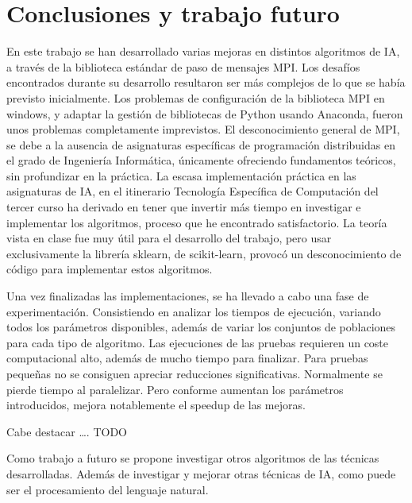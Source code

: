 \chapter{Conclusiones y trabajo futuro}
	
	En este trabajo se han desarrollado varias mejoras en distintos algoritmos de IA, a través de la biblioteca estándar de paso de mensajes MPI.
	Los desafíos encontrados durante su desarrollo resultaron ser más complejos de lo que se había previsto inicialmente. Los problemas de configuración de la biblioteca MPI en windows, y adaptar la gestión de bibliotecas de Python usando Anaconda, fueron unos problemas completamente imprevistos. El desconocimiento general de  MPI, se debe a la ausencia de asignaturas específicas de programación distribuidas en el grado de Ingeniería Informática, únicamente ofreciendo fundamentos teóricos, sin profundizar en la práctica. 
	La escasa implementación práctica en las asignaturas de IA, en el itinerario Tecnología Específica de Computación del tercer curso ha derivado en tener que invertir más tiempo en investigar e implementar los algoritmos, proceso que he encontrado satisfactorio. La teoría vista en clase fue muy útil para el desarrollo del trabajo, pero usar exclusivamente la librería sklearn, de scikit-learn, provocó un desconocimiento de código para implementar estos algoritmos.
	
	Una vez finalizadas las implementaciones, se ha llevado a cabo una fase de experimentación. Consistiendo en analizar los tiempos de ejecución, variando todos los parámetros disponibles, además de variar los conjuntos de poblaciones para cada tipo de algoritmo.
	Las ejecuciones de las pruebas requieren un coste computacional alto, además de mucho tiempo para finalizar. Para pruebas pequeñas no se consiguen apreciar reducciones significativas. Normalmente se pierde tiempo al paralelizar. Pero conforme aumentan los parámetros introducidos, mejora notablemente el speedup de las mejoras.
	
	Cabe destacar …. TODO %
	
	
	
	Como trabajo a futuro se propone investigar otros algoritmos de las técnicas desarrolladas. Además de investigar y mejorar otras técnicas de IA, como puede ser el procesamiento del lenguaje natural.
	